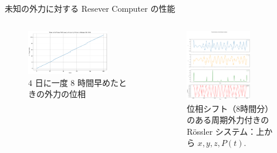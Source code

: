 \begin{frame}{未知の外力に対する Resever Computer の性能}
\begin{columns}[T]
\begin{column}{.5\textwidth}
            \vspace{-.5em}
            \begin{figure}
                \includegraphics[width=0.8\textwidth]{Fig/phase_shift_plot.png}
                \caption{\scriptsize{$4$ 日に一度 $8$ 時間早めたときの外力の位相}}
            \end{figure}
        \end{column}
        \begin{column}{.5\textwidth}
            \begin{figure}
                \includegraphics[width=0.7\textwidth]{Fig/NEWrossler_waves.png}
                \caption{\scriptsize{位相シフト（8時間分）のある周期外力付きのRössler システム：上から $x, y, z, P(t)$. }}
            \end{figure}
        \end{column}
      \end{columns}
    
\end{frame}


